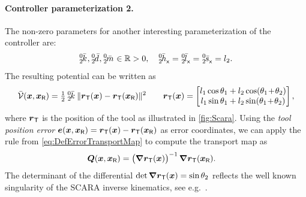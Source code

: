 \paragraph{Controller parameterization 2.}
The non-zero parameters for another interesting parameterization of the controller are:
\begin{align}
 \bodyStiffnessC{0}{2}, \bodyDampingC{0}{2}, \bodyMassC{0}{2} \in \RealNum > 0,
\quad
 \bodyCOSCoeffC{0}{2}{\idxX} = \bodyCODCoeffC{0}{2}{\idxX} = \bodyCOMCoeffC{0}{2}{\idxX} = l_2.
\end{align}
The resulting potential can be written as
\begin{align}
 \potentialEnergyC(\sysCoord, \sysCoordR) = \tfrac{1}{2} \, \bodyStiffnessC{0}{2} \, \norm{\toolPos(\sysCoord) - \toolPos(\sysCoordR)}^2
\qquad
 \toolPos(\sysCoord) = 
 \begin{bmatrix}
  l_1 \cos \jointAngle[1] + l_2 \cos (\jointAngle[1] \!+\! \jointAngle[2]) \\
  l_1 \sin \jointAngle[1] + l_2 \sin (\jointAngle[1] \!+\! \jointAngle[2]) \\
 \end{bmatrix},
\end{align}
where $\toolPos$ is the position of the tool as illustrated in \autoref{fig:Scara}.
Using the \textit{tool position error} $\sysCoordE(\sysCoord, \sysCoordR) = \toolPos(\sysCoord) - \toolPos(\sysCoordR)$ as error coordinates, we can apply the rule from \eqref{eq:DefErrorTransportMap} to compute the transport map as
\begin{align}
 \sysTransportMap(\sysCoord, \sysCoordR) &= \big( \differential\toolPos (\sysCoord) \big)^{-1} \, \differential \toolPos (\sysCoordR).
\end{align}
The determinant of the differential $\det\differential\toolPos(\sysCoord) = \sin\jointAngle[2]$ reflects the well known singularity of the SCARA inverse kinematics, see e.g.\ \cite[example 3.6]{Murray:Robotic}.

